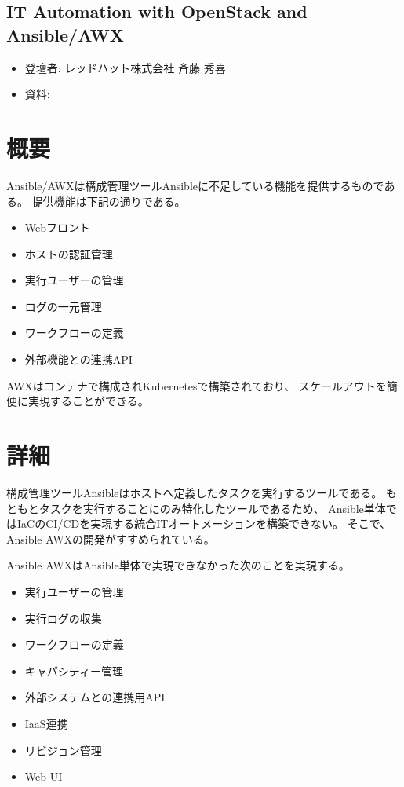 \begin{center}
  \section*{IT Automation with OpenStack and Ansible/AWX}
\end{center}


\begin{flushright}
  \begin{itemize}
  \item   登壇者: レッドハット株式会社 斉藤 秀喜
  \item 資料: 
  \end{itemize}
\end{flushright}


\section*{概要}

Ansible/AWXは構成管理ツールAnsibleに不足している機能を提供するものである。
提供機能は下記の通りである。

\begin{itemize}
\item Webフロント
\item ホストの認証管理
\item 実行ユーザーの管理
\item ログの一元管理
\item ワークフローの定義
\item 外部機能との連携API
\end{itemize}

AWXはコンテナで構成されKubernetesで構築されており、
スケールアウトを簡便に実現することができる。

\section*{詳細}

構成管理ツールAnsibleはホストへ定義したタスクを実行するツールである。
もともとタスクを実行することにのみ特化したツールであるため、
Ansible単体ではIaCのCI/CDを実現する統合ITオートメーションを構築できない。
そこで、Ansible AWXの開発がすすめられている。

Ansible AWXはAnsible単体で実現できなかった次のことを実現する。

\begin{itemize}
\item 実行ユーザーの管理
\item 実行ログの収集
\item ワークフローの定義
\item キャパシティー管理
\item 外部システムとの連携用API
\item IaaS連携
\item リビジョン管理
\item Web UI
\end{itemize}

